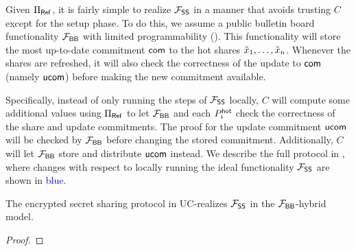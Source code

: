 Given $\Pi_{\sf Ref}$, it is fairly simple to realize $\mathcal{F}_\mathsf{SS}$ in a manner that avoids trusting $C$ except for the setup phase.
To do this, we assume a public bulletin board functionality $\mathcal{F}_\mathsf{BB}$ with limited programmability (). This functionality will store the most up-to-date commitment $\mathsf{com}$ to the hot shares $\tilde{x}_1, \dots, \tilde{x}_n$. Whenever the shares are refreshed, it will also check the correctness of the update to $\mathsf{com}$ (namely $\mathsf{ucom}$) before making the new commitment available.

Specifically, instead of only running the steps of $\mathcal{F}_\mathsf{SS}$ locally, $C$ will compute some additional values using $\Pi_{\sf Ref}$ to let $\mathcal{F}_\mathsf{BB}$ and each $P_i^{\mathsf{hot}}$ check the correctness of the share and update commitments. 
The proof for the update commitment $\mathsf{ucom}$ will be checked by $\mathcal{F}_\mathsf{BB}$ before changing the stored commitment. 
Additionally, $C$ will let $\mathcal{F}_\mathsf{BB}$ store and distribute $\mathsf{ucom}$ instead. 
\renewcommand{\chblue}[1]{\textcolor{blue}{#1}}
We describe the full protocol in , where changes with respect to locally running the ideal functionality $\mathcal{F}_\mathsf{SS}$ are shown in \chblue{blue}.




\renewcommand{\chblue}[1]{#1}

\begin{theorem}\label{thm:fs-protocol}
The encrypted secret sharing protocol in  UC-realizes $\mathcal{F}_\mathsf{SS}$ in the $\mathcal{F}_\mathsf{BB}$-hybrid model.
\end{theorem}

\begin{proof}
    \todo{}
\end{proof}